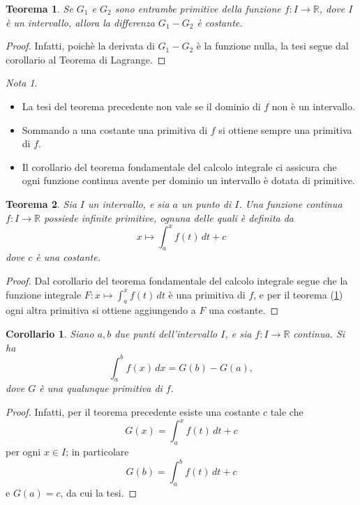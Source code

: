 \documentclass{article}
\theoremstyle{plain}
\newtheorem{thm}{Teorema}[section]
\newtheorem{cor}{Corollario}
\theoremstyle{definition}
\theoremstyle{remark}
\newtheorem{note}{Nota}
\begin{document}
\vspace{10pt}

\begin{bxthm}
\begin{thm}\label{thmuno}
    Se $G_1$ e $G_2$ sono entrambe primitive della funzione $f:I\to\mathbb{R}$, dove $I$ è un intervallo, allora la differenza $G_1-G_2$ è costante.
\end{thm}
\end{bxthm}
\begin{proof}
    Infatti, poichè la derivata di $G_1-G_2$ è la funzione nulla, la tesi segue dal corollario al Teorema di Lagrange.
\end{proof}

\vspace{10pt}

\begin{note}\hfill
\begin{itemize}
    \item La tesi del teorema precedente non vale se il dominio di $f$ non è un intervallo.
    \item Sommando a una costante una primitiva di $f$ si ottiene sempre una primitiva di $f$.
    \item Il corollario del teorema fondamentale del calcolo integrale ci assicura che ogni funzione continua avente per dominio un intervallo è dotata di primitive.
\end{itemize}
\end{note}

\vspace{10pt}

\begin{bxthm}
\begin{thm}\label{thmdue}
    Sia $I$ un intervallo, e sia $a$ un punto di $I$. Una funzione continua $f:I\to\mathbb{R}$ possiede infinite primitive, ognuna delle quali è definita da 
    \[x\mapsto \int_{a}^{x}f(t)\,dt+c\]
    dove $c$ è una costante.
\end{thm}
\end{bxthm}
\begin{proof}
    Dal corollario del teorema fondamentale del calcolo integrale segue che la funzione integrale $F:x\mapsto \int_{a}^{x}f(t)\,dt$ è una primitiva di $f$, e per il teorema (\ref{thmuno}) ogni altra primitiva si ottiene aggiungendo a $F$ una costante.
\end{proof}

\vspace{10pt}

\begin{bxthm}
\begin{cor}\label{corprim}
    Siano $a,b$ due punti dell'intervallo $I$, e sia $f:I\to\mathbb{R}$ continua. Si ha \[\int_{a}^{b}f(x)\,dx=G(b)-G(a),\] dove $G$ è una qualunque primitiva di $f$.
\end{cor}
\end{bxthm}
\begin{proof}
    Infatti, per il teorema precedente esiste una costante $c$ tale che \[G(x)=\int_{a}^{x}f(t)\,dt+c\] per ogni $x\in I$; in particolare \[G(b)=\int_{a}^{b}f(t)\,dt+c\] e $G(a)=c$, da cui la tesi.
\end{proof}
\end{document}
